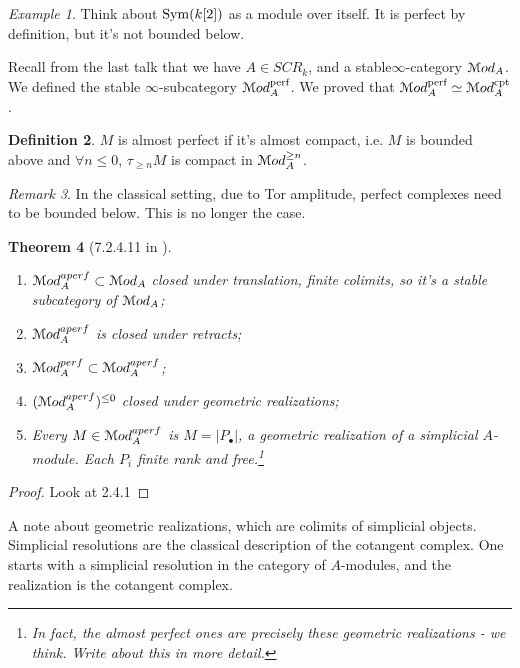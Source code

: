 \documentclass[10pt,a4paper,reqno,oneside]{book} %
\theoremstyle{plain}
\newtheorem{thm}{Theorem}[section]
\theoremstyle{definition}
\newtheorem{defin}[thm]{Definition}
\theoremstyle{remark}
\newtheorem{eg}[thm]{Example}
\newtheorem{rem}[thm]{Remark}
\numberwithin{equation}{section}
\begin{document}
\begin{eg}
Think about $\operatorname{Sym}(k[2])$ as a module over itself. It is perfect by definition, but it's not bounded below.
\end{eg}




Recall from the last talk that we have $A \in SCR_k$, and a stable$\infty$-category $\mathcal M od_A$. We defined the
stable $\infty$-subcategory $\mathcal M od_A^{\text{perf}}$. We proved that $\mathcal M od_A^{\text{perf}}\simeq \mathcal M od_A^{\text{cpt}}$.


\begin{defin}
$M$ is almost perfect if it's almost compact, i.e. $M$ is bounded above and $\forall n\leq 0$, $\tau_{\geq n}M$ is 
compact in $\mathcal M od_A^{\geq n}$.
\end{defin}

\begin{rem}
In the classical setting, due to Tor amplitude, perfect complexes need to be bounded below. This is no longer the case.
\end{rem}

\begin{thm}[7.2.4.11 in \cite{Lurie_Higher_algebra}]
\begin{enumerate}
\item $\mathcal M od_A^{aperf} \subset \mathcal M od_A$ closed under translation, finite colimits, so it's a stable subcategory of
$\mathcal M od_A$;
\item $\mathcal M od_A^{aperf}$ is closed under retracts;
\item $\mathcal M od_A^{perf} \subset \mathcal M od_A^{aperf}$;
\item $(\mathcal M od_A^{aperf})^{\leq 0}$ closed under geometric realizations;
\item Every $M \in \mathcal M od_A^{aperf}$ is $M = |P_{\bullet}|$, a geometric realization of a simplicial $A$-module. Each 
$P_i$ finite rank and free.\footnote{In fact, the almost perfect ones are precisely these geometric realizations - we think.
Write about this in more detail.}
\end{enumerate}
\end{thm}

\begin{proof}
Look at 2.4.1
\end{proof}

A note about geometric realizations, which are colimits of simplicial objects. Simplicial resolutions are the classical
description of the cotangent complex. One starts with a simplicial resolution in the category of $A$-modules, and the
realization is the cotangent complex.
\end{document}
